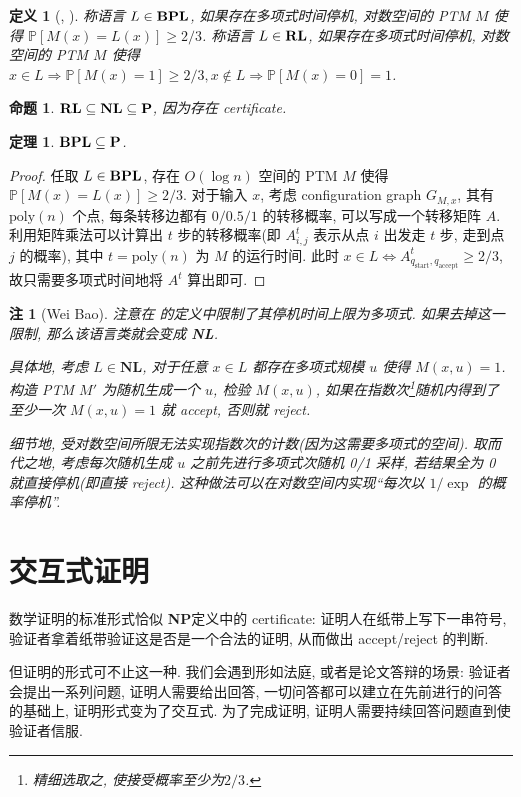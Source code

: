 \documentclass[8pt]{article}
\theoremstyle{compact}
\newtheorem{theorem}{定理}[section]
\newtheorem{definition}{定义}[section]
\newtheorem{proposition}{命题}[section]
\newtheorem{remark}{注}[section]
\def\ge{\geqslant}
\def\P{\textbf{P}}
\def\NP{\textbf{NP}}
\def\NL{\textbf{NL}}
\begin{document}
\begin{definition}[\BPL, \RL]
	称语言 $L \in \textbf{BPL}$, 如果存在多项式时间停机, 对数空间的 PTM $M$ 使得 $\mathbb P[M(x) = L(x)] \ge 2/3$. 称语言 $L \in \textbf{RL}$, 如果存在多项式时间停机, 对数空间的 PTM $M$ 使得 $x \in L \Rightarrow \mathbb P[M(x)=1] \ge 2/3, x \notin L \Rightarrow \mathbb P[M(x) = 0] = 1$.
\end{definition}
\begin{proposition}
	$\RL \subseteq \NL \subseteq \P$, 因为存在 certificate.
\end{proposition}
\begin{theorem}
	$\BPL \subseteq \P$.
\end{theorem}
\begin{proof}
	任取 $L \in \textbf{BPL}$, 存在 $O(\log n)$ 空间的 PTM $M$ 使得 $\mathbb P[M(x) = L(x)] \ge 2/3$. 对于输入 $x$, 考虑 configuration graph $G_{M, x}$, 其有 $\text{poly}(n)$ 个点, 每条转移边都有 $0/0.5/1$ 的转移概率, 可以写成一个转移矩阵 $A$. 利用矩阵乘法可以计算出 $t$ 步的转移概率(即 $A^t_{i, j}$ 表示从点 $i$ 出发走 $t$ 步, 走到点 $j$ 的概率), 其中 $t = \text{poly}(n)$ 为 $M$ 的运行时间. 此时 $x \in L \Leftrightarrow A^t_{q_{\text{start}}, q_{\text{accept}}} \ge 2/3$, 故只需要多项式时间地将 $A^t$ 算出即可.
\end{proof}
\begin{remark}[Wei Bao]
	注意在 \RL 的定义中限制了其停机时间上限为多项式. 如果去掉这一限制, 那么该语言类就会变成 \NL.

	具体地, 考虑 $L \in \NL$, 对于任意 $x \in L$ 都存在多项式规模 $u$ 使得 $M(x, u) = 1$. 构造 PTM $M'$ 为随机生成一个 $u$, 检验 $M(x, u)$, 如果在指数次\footnote{精细选取之, 使接受概率至少为$2/3$.}随机内得到了至少一次 $M(x, u) = 1$ 就 accept, 否则就 reject. 

	细节地, 受对数空间所限无法实现指数次的计数(因为这需要多项式的空间). 取而代之地, 考虑每次随机生成 $u$ 之前先进行多项式次随机 0/1 采样, 若结果全为 0 就直接停机(即直接 reject). 这种做法可以在对数空间内实现“每次以 $1 / \exp$ 的概率停机”.


\end{remark}

\newpage
\section{交互式证明}
数学证明的标准形式恰似 \NP 定义中的 certificate: 证明人在纸带上写下一串符号, 验证者拿着纸带验证这是否是一个合法的证明, 从而做出 accept/reject 的判断.

但证明的形式可不止这一种. 我们会遇到形如法庭, 或者是论文答辩的场景: 验证者会提出一系列问题, 证明人需要给出回答, 一切问答都可以建立在先前进行的问答的基础上, 证明形式变为了交互式. 为了完成证明, 证明人需要持续回答问题直到使验证者信服.
\end{document}
